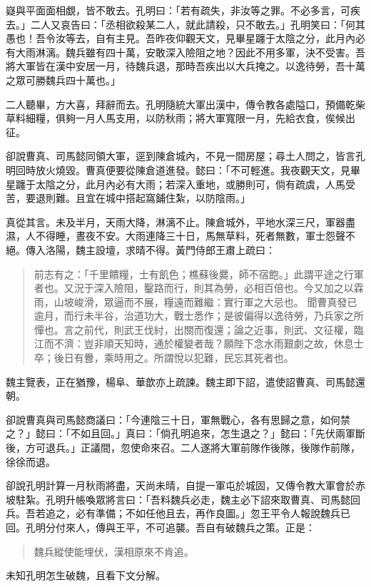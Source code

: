 嶷與平面面相覷，皆不敢去。孔明曰：「若有疏失，非汝等之罪。不必多言，可疾去。」二人又哀告曰：「丞相欲殺某二人，就此請殺，只不敢去。」孔明笑曰：「何其愚也！吾令汝等去，自有主見。吾昨夜仰觀天文，見畢星躔于太陰之分，此月內必有大雨淋漓。魏兵雖有四十萬，安敢深入險阻之地？因此不用多軍，決不受害。吾將大軍皆在漢中安居一月，待魏兵退，那時吾疾出以大兵掩之。以逸待勞，吾十萬之眾可勝魏兵四十萬也。」

二人聽畢，方大喜，拜辭而去。孔明隨統大軍出漢中，傳令教各處隘口，預備乾柴草料細糧，俱夠一月人馬支用，以防秋雨；將大軍寬限一月，先給衣食，俟候出征。

卻說曹真、司馬懿同領大軍，逕到陳倉城內，不見一間房屋；尋土人問之，皆言孔明回時放火燒毀。曹真便要從陳倉道進發。懿曰：「不可輕進。我夜觀天文，見畢星躔于太陰之分，此月內必有大雨；若深入重地，或勝則可，倘有疏虞，人馬受苦，要退則難。且宜在城中搭起窩鋪住紮，以防陰雨。」

真從其言。未及半月，天雨大降，淋漓不止。陳倉城外，平地水深三尺，軍器盡濕，人不得睡，晝夜不安。大雨連降三十日，馬無草料，死者無數，軍士怨聲不絕。傳入洛陽，魏主設壇，求晴不得。黃門侍郎王肅上疏曰：

\begin{quote}
前志有之：「千里饋糧，士有飢色；樵蘇後爨，師不宿飽。」此謂平途之行軍者也。又況于深入險阻，鑿路而行，則其為勞，必相百倍也。今又加之以霖雨，山坡峻滑，眾逼而不展，糧遠而難繼：實行軍之大忌也。
聞曹真發已逾月，而行未半谷，治道功大，戰士悉作；是彼偏得以逸待勞，乃兵家之所憚也。言之前代，則武王伐紂，出關而復還；論之近事，則武、文征權，臨江而不濟：豈非順天知時，通於權變者哉？願陛下念水雨艱劇之故，休息士卒；後日有釁，乘時用之。所謂悅以犯難，民忘其死者也。
\end{quote}

魏主覽表，正在猶豫，楊阜、華歆亦上疏諫。魏主即下詔，遣使詔曹真、司馬懿還朝。

卻說曹真與司馬懿商議曰：「今連陰三十日，軍無戰心，各有思歸之意，如何禁之？」懿曰：「不如且回。」真曰：「倘孔明追來，怎生退之？」懿曰：「先伏兩軍斷後，方可退兵。」正議間，忽使命來召。二人遂將大軍前隊作後隊，後隊作前隊，徐徐而退。

卻說孔明計算一月秋雨將盡，天尚未晴，自提一軍屯於城固，又傳令教大軍會於赤坡駐紮。孔明升帳喚眾將言曰：「吾料魏兵必走，魏主必下詔來取曹真、司馬懿回兵。吾若追之，必有準備；不如任他且去，再作良圖。」忽王平令人報說魏兵已回。孔明分付來人，傳與王平，不可追襲。吾自有破魏兵之策。正是：

\begin{quote}
魏兵縱使能埋伏，漢相原來不肯追。
\end{quote}

未知孔明怎生破魏，且看下文分解。
